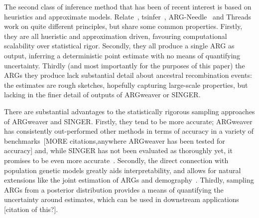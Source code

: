 \documentclass{article}
\begin{document}
The second class of inference method that has been of recent interest 
is based on heuristics and approximate models.
Relate~\citep{speidel_method_2019},
tsinfer~\citep{kelleher_inferring_2019},
ARG-Needle~\citep{zhang_biobank-scale_2023} 
and Threads~\citep{gunnarsson_scalable_2024}
work on quite different 
principles, but share some common properties. 
Firstly, they are all 
hueristic and approximation driven, favouring computational
scalability over statistical rigor.
Secondly, they all produce a single
ARG as output, inferring a deterministic point estimate with no means 
of quantifying uncertainty. Thirdly (and most importantly for the 
purposes of this paper) the ARGs they produce lack substantial
detail about ancestral recombination events: the estimates are
rough sketches, hopefully capturing large-scale properties, but lacking
in the finer detail of outputs of ARGweaver or SINGER. 

There are substantial advantages to the statistically rigorous sampling 
approaches of ARGweaver and SINGER. Firstly, they tend to be more 
accurate; ARGweaver has consistently out-performed other methods in terms 
of accuracy in a variety of benchmarks~\citep{brandt2022evaluation}[MORE
citations,anywhere ARGweaver has been tested for accuracy]
and, while SINGER has not been evaluated as thoroughly yet, it promises
to be even more accurate~\citep{deng_robust_2024}. 
Secondly, the direct connection with
population genetic models greatly aids interpretability, and allows for
natural extensions like the joint estimation of ARGs and
demography~\citep{hubisz_mapping_2020}. Thirdly, sampling ARGs from a
posterior distribution provides a means of quantifying the uncertainty 
around estimates, which can be used in downstream applications [citation
of this?]. 
\end{document}
